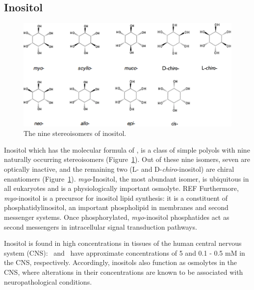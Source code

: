 \subsection{Inositol}
\begin{figure}
	\centering
	\includegraphics[width=5in]{figures/introduction/inositol.pdf}
	\caption[Inositol stereoisomers]{The nine stereoisomers of inositol.}
	\label{fig:inositols}
\end{figure}

Inositol which has the molecular formula of , is a class of simple polyols with nine naturally occurring stereoisomers (Figure~\ref{fig:inositols}).\cite{Fisher:2002tk} Out of these nine isomers, seven are optically inactive, and the remaining two (L- and D-\emph{chiro}-inositol) are chiral enantiomers (Figure~\ref{fig:inositols}).\cite{Fisher:2002tk} \emph{myo}-Inositol, the most abundant isomer, is ubiquitous in all eukaryotes and is a physiologically important osmolyte. REF Furthermore, \emph{myo}-inositol is a precursor for inositol lipid synthesis: it is a constituent of phosphatidylinositol, an important phospholipid in membranes and second messenger systems.\cite{Fisher:2002tk} Once phosphorylated, \emph{myo}-inositol phosphatides act as second messengers in intracellular signal transduction pathways.\cite{Fisher:2002tk} 

Inositol is found in high concentrations in tissues of the human central nervous system (CNS): \myo\ and \scylloi\ have approximate concentrations of 5 and 0.1 - 0.5 mM in the CNS, respectively.\cite{Fisher:2002tk} Accordingly, inositols also function as osmolytes in the CNS, where alterations in their concentrations are known to be associated with neuropathological conditions.\cite{Michaelis:1993gf, Fisher:2002tk}

